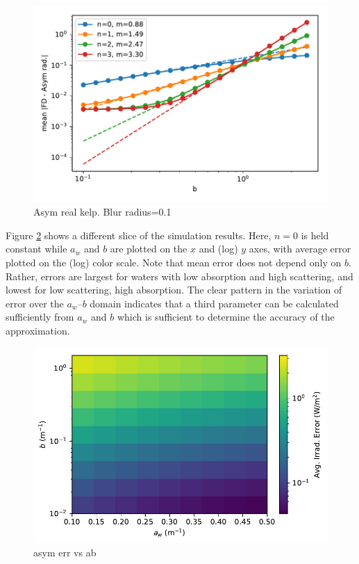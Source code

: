 \documentclass[ms,cpyr,lof,lot]{uathesis}
\begin{document}
\newcommand\rdfigwidth{4.5in}

\begin{figure}[H]
  \centering
  \includegraphics[width=\rdfigwidth]{verify_real_kelp_asym_b_scat_ss_sm_th_a05_br01_72x10_rad_err}
  \caption{Asym real kelp. Blur radius=0.1}
  \label{fig:asym_real_kelp_br01}
\end{figure}

Figure \ref{fig:asym_err_vs_ab} shows a different slice of the simulation results.
Here, $n=0$ is held constant while $a_w$ and $b$ are plotted on the $x$ and (log) $y$ axes, with average error plotted on the (log) color scale.
Note that mean error does not depend only on $b$.
Rather, errors are largest for waters with low absorption and high scattering, and lowest for low scattering, high absorption.
The clear pattern in the variation of error over the $a_w$--$b$ domain indicates that a third parameter can be calculated sufficiently from $a_w$ and $b$ which is sufficient to determine the accuracy of the approximation.

\begin{figure}[H]
  \centering
  \includegraphics[width=\rdfigwidth]{asym_err_vs_ab}
  \caption{asym err vs ab}
  \label{fig:asym_err_vs_ab}
\end{figure}
\end{document}
